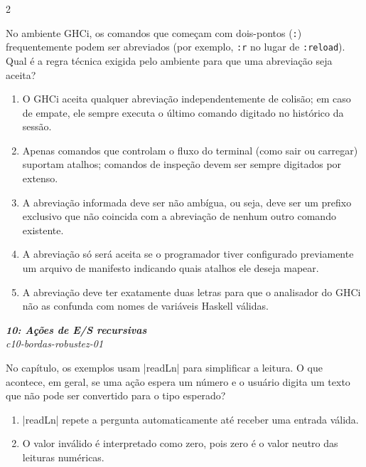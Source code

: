 \documentclass[a4paper,10pt,brazil]{article}
\begin{document}
\begin{multicols}{2}
\begin{flushright}
\end{flushright}
No ambiente GHCi, os comandos que começam com dois-pontos (\texttt{:}) frequentemente podem ser abreviados (por exemplo, \texttt{:r} no lugar de \texttt{:reload}). Qual é a regra técnica exigida pelo ambiente para que uma abreviação seja aceita?

\begin{enumerate}
  \item O GHCi aceita qualquer abreviação independentemente de colisão; em caso de empate, ele sempre executa o último comando digitado no histórico da sessão.

  \item Apenas comandos que controlam o fluxo do terminal (como sair ou carregar) suportam atalhos; comandos de inspeção devem ser sempre digitados por extenso.

  \item A abreviação informada deve ser não ambígua, ou seja, deve ser um prefixo exclusivo que não coincida com a abreviação de nenhum outro comando existente.

  \item A abreviação só será aceita se o programador tiver configurado previamente um arquivo de manifesto indicando quais atalhos ele deseja mapear.

  \item A abreviação deve ter exatamente duas letras para que o analisador do GHCi não as confunda com nomes de variáveis Haskell válidas.


\end{enumerate}

\begin{flushright}
  \footnotesize
  \textit{\textbf{10: Ações de E/S recursivas}}\\
  \textit{c10-bordas-robustez-01}\\

\end{flushright}
No capítulo, os exemplos usam \haskellinline|readLn| para simplificar a leitura. O que acontece, em geral, se uma ação espera um número e o usuário digita um texto que não pode ser convertido para o tipo esperado?

\begin{enumerate}
  \item \haskellinline|readLn| repete a pergunta automaticamente até receber uma entrada válida.

  \item O valor inválido é interpretado como zero, pois zero é o valor neutro das leituras numéricas.


\end{enumerate}
\end{multicols}
\end{document}
